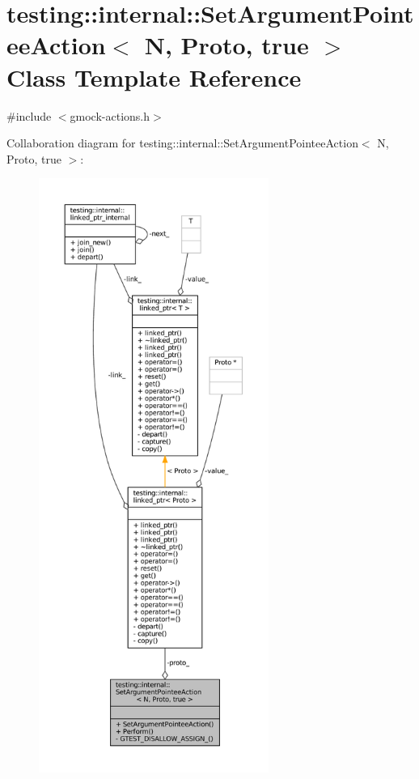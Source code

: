 \hypertarget{classtesting_1_1internal_1_1SetArgumentPointeeAction_3_01N_00_01Proto_00_01true_01_4}{}\section{testing\+:\+:internal\+:\+:Set\+Argument\+Pointee\+Action$<$ N, Proto, true $>$ Class Template Reference}
\label{classtesting_1_1internal_1_1SetArgumentPointeeAction_3_01N_00_01Proto_00_01true_01_4}


{\ttfamily \#include $<$gmock-\/actions.\+h$>$}



Collaboration diagram for testing\+:\+:internal\+:\+:Set\+Argument\+Pointee\+Action$<$ N, Proto, true $>$\+:
\nopagebreak
\begin{figure}[H]
\begin{center}
\leavevmode
\includegraphics[height=550pt]{classtesting_1_1internal_1_1SetArgumentPointeeAction_3_01N_00_01Proto_00_01true_01_4__coll__graph}
\end{center}
\end{figure}
